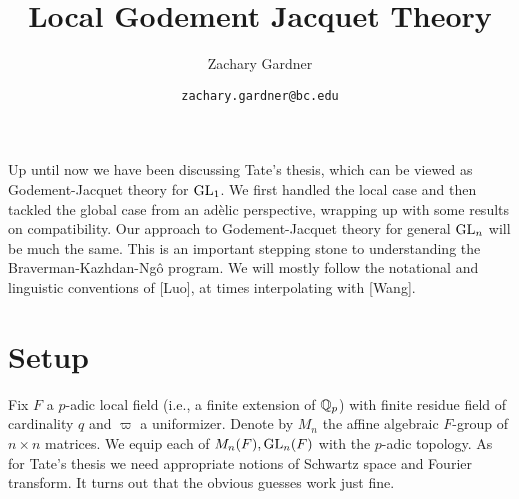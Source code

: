\documentclass[11pt]{article}
\begin{document}
\title{Local Godement Jacquet Theory}
\author{Zachary Gardner}
\date{\texttt{zachary.gardner@bc.edu}}
\maketitle

Up until now we have been discussing Tate's thesis, which can be viewed as Godement-Jacquet theory for $\textup{GL}_1$. We first handled the local case and then tackled the global case from an ad\`{e}lic perspective, wrapping up with some results on compatibility. Our approach to Godement-Jacquet theory for general $\textup{GL}_n$ will be much the same. This is an important stepping stone to understanding the Braverman-Kazhdan-Ng\^{o} program. We will mostly follow the notational and linguistic conventions of [Luo], at times interpolating with [Wang].

\section{Setup}
Fix $F$ a $p$-adic local field (i.e., a finite extension of $\mathbb{Q}_p$) with finite residue field of cardinality $q$ and $\varpi$ a uniformizer. Denote by $M_n$ the affine algebraic $F$-group of $n\times n$ matrices. We equip each of $M_n(F),\textup{GL}_n(F)$ with the $p$-adic topology. As for Tate's thesis we need appropriate notions of Schwartz space and Fourier transform. It turns out that the obvious guesses work just fine. 
\end{document}
